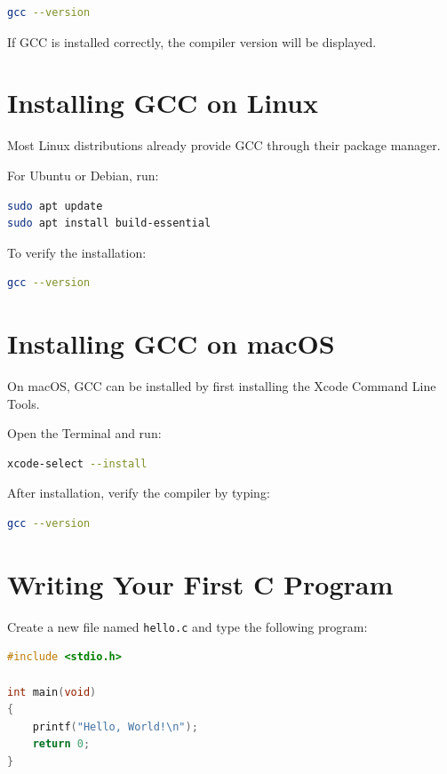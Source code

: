 \documentclass[12pt,openany]{book}
\begin{document}
\begin{lstlisting}[language=bash]
gcc --version
\end{lstlisting}

If GCC is installed correctly, the compiler version will be displayed.

\section{Installing GCC on Linux}

Most Linux distributions already provide GCC through their package manager.

For Ubuntu or Debian, run:

\begin{lstlisting}[language=bash]
sudo apt update
sudo apt install build-essential
\end{lstlisting}

To verify the installation:

\begin{lstlisting}[language=bash]
gcc --version
\end{lstlisting}

\section{Installing GCC on macOS}

On macOS, GCC can be installed by first installing the Xcode Command Line Tools.

Open the Terminal and run:

\begin{lstlisting}[language=bash]
xcode-select --install
\end{lstlisting}

After installation, verify the compiler by typing:

\begin{lstlisting}[language=bash]
gcc --version
\end{lstlisting}

\section{Writing Your First C Program}

Create a new file named \texttt{hello.c} and type the following program:

\begin{lstlisting}[language=C]
#include <stdio.h>

int main(void)
{
    printf("Hello, World!\n");
    return 0;
}
\end{lstlisting}
\end{document}
